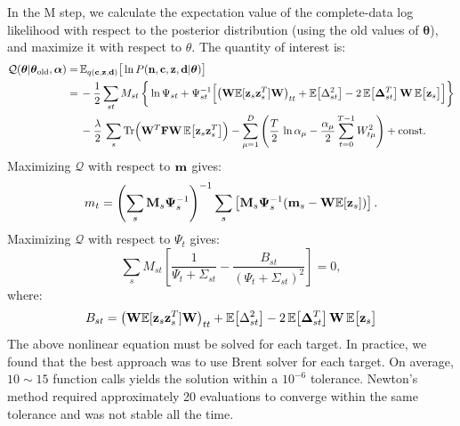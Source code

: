 \documentclass[nofootinbib,amssymb,amsmath]{revtex4}
\newcommand{\vd}{{\bf d}}
\newcommand{\vc}{{\bf c}}
\newcommand{\vz}{{\bf z}}
\newcommand{\vn}{{\bf n}}
\newcommand{\vm}{{\bf m}}
\newcommand{\vM}{{\bf M}}
\newcommand{\vW}{{\bf W}}
\newcommand{\vF}{{\bf F}}
\newcommand{\vPsi}{{\bf \Psi}}
\newcommand{\vDelta}{{\bf \Delta}}
\newcommand{\vtheta}{{\boldsymbol \theta}}
\newcommand{\valpha}{{\boldsymbol \alpha}}
\newcommand{\EE}{\mathbb{E}}
\begin{document}
In the M step, we calculate the expectation value of the complete-data log likelihood with respect to the posterior distribution (using the old values of $\vtheta$), and maximize it with respect to $\theta$. The quantity of interest is:
%
\begin{align}
\mathcal{Q}(\vtheta|\vtheta_\mathrm{old}, \valpha) =&\, \EE_{q(\vc, \vz, \vd)}\big[\ln P(\vn, \vc, \vz, \vd | \vtheta)\big]\nonumber\\
=&\, - \frac{1}{2}\sum_{st} M_{st} \, \bigg\{\ln \Psi_{st} + \Psi_{st}^{-1}\Big[\big(\vW \EE[\vz_s \vz_s^T] \vW\big)_{tt} + \EE\big[\Delta_{st}^2\big] - 2 \, \EE\big[\vDelta_{st}^T\big] \, \vW \, \EE\big[\vz_s\big]\Big]\bigg\}\nonumber\\
&\,- \frac{\lambda}{2} \, \sum_s \mathrm{Tr}\Big(\vW^T \vF \vW \, \EE\big[\vz_s \vz_s^T\big]\Big) - \sum_{\mu=1}^{D}\left(\frac{T}{2} \, \ln \alpha_\mu -\frac{\alpha_\mu}{2} \sum_{t=0}^{T-1} W_{t\mu}^2  \right) + \mathrm{const.}
\label{eq:posterior_exp_log_likelihood}
\end{align}
%
Maximizing $\mathcal{Q}$ with respect to $\vm$ gives:
\begin{align}
m_t = \left(\sum_s \vM_s \vPsi_{s}^{-1} \right)^{-1} \sum_s \left[ \vM_s \vPsi_{s}^{-1}  (\vm_{s}  - \vW  \EE[\vz_{s}] ) \right].
\end{align}
Maximizing $\mathcal{Q}$ with respect to $\Psi_t$ gives:
\begin{equation}\label{eq:psi_stationarity}
\sum_s M_{st}\left[\frac{1}{\Psi_t + \Sigma_{st}} - \frac{B_{st}}{(\Psi_t + \Sigma_{st})^2} \right] = 0,
\end{equation}
where:
\begin{equation}
B_{st} = \big(\vW \EE[\vz_s \vz_s^T] \vW\big)_{tt} + \EE\big[\Delta_{st}^2\big] - 2 \, \EE\big[\vDelta_{st}^T\big] \, \vW \, \EE\big[\vz_s\big]
\end{equation}
The above nonlinear equation must be solved for each target. In practice, we found that the best approach was to use Brent solver for each target. On average, $10 \sim 15$ function calls yields the solution within a $10^{-6}$ tolerance. Newton's method required approximately 20 evaluations to converge within the same tolerance and was not stable all the time.\\
\end{document}
